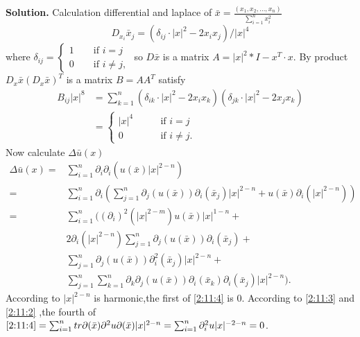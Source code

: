 \documentclass[a4paper]{book}
\newenvironment{solution}%
{\noindent\textbf{Solution.}}%
{\qedhere}
\numberwithin{equation}{chapter}
\theoremstyle{definition}
\begin{document}
\begin{multicols}{2}
\begin{solution}
	Calculation differential and laplace of $\bar{x} = \frac{(x_1, x_2,...,x_n)}{\sum_{i = 1}^{n} x_i^2} $ 
	\begin{equation}\label{2:11:2}
		D_{x_i} \bar{x}_j = (\delta_{ij} \cdot |x|^2 - 2x_ix_j)/ |x|^4 
	\end{equation}
	where $\delta_{ij} = 
	\begin{cases}
	1 \qquad \text{if } i = j \\
	0 \qquad \text{if } i \neq j,
	\end{cases}$
	so $D\bar{x}$ is a matrix $A = |x|^2 * I - x^T \cdot x$.
	By product $D_x \bar{x}(D_x \bar{x})^T$ is a matrix $B = AA^T$ satisfy
	\begin{equation}\label{2:11:3}
	\begin{aligned} 
		B_{ij}|x|^8 &= \sum_{k = 1}^{n}(\delta_{ik} \cdot |x|^2 - 2x_{i} x_k)(\delta_{jk} \cdot |x|^2 - 2x_{j} x_k)\\
		&=
		\begin{cases}
		|x|^4 \qquad &\text{if } i = j \\ 
		0 \qquad &\text{if } i \neq j.
		\end{cases}
	\end{aligned} 
	\end{equation}
	Now calculate $\Delta \bar{u}(x)$
	\begin{equation}\label{2:11:4}
		\begin{aligned}
		\Delta \bar{u}(x) =& \sum_{i = 1}^{n} \partial_i \partial_i(u(\bar{x})|x|^{2-n}) \\
		=&  \sum_{i = 1}^{n} \partial_i (\sum_{j = 1}^{n}\partial_j (u(\bar{x}))\partial_i(\bar{x}_j)|x|^{2-n} + u(\bar{x})\partial_i(|x|^{2-n}))  \\
		=& \sum_{i = 1}^{n}((\partial_i)^2(|x|^{2-m})u(\bar{x})|x|^{1-n} + \\ &2\partial_i(|x|^{2-n})\sum_{j = 1}^{n}\partial_j (u(\bar{x}))\partial_i(\bar{x}_j) + \\
		&\sum_{j = 1}^{n}\partial_j (u(\bar{x})) \partial_i^2(\bar{x}_j)|x|^{2-n}　+\\
		&\sum_{j = 1}^{n}\sum_{k = 1}^{n}\partial_k\partial_j(u(\bar{x})) \partial_i(\bar{x}_k)\partial_i(\bar{x}_j)|x|^{2-n}　  ). 
		\end{aligned}
	\end{equation}
	According to $|x|^{2-n}$ is harmonic,the first of \ref{2:11:4} is 0.
	According to \ref{2:11:3} and \ref{2:11:2} ,the fourth of $\ref{2:11:4} = \sum_{i = 1}^{n} tr{\partial(\bar{x}) \partial^2u \partial(\bar{x})}|x|^{2-n} = \sum_{i = 1}^{n} \partial_i^2 u |x|^{-2-n} = 0$. 

\end{solution}
\end{multicols}
\end{document}
